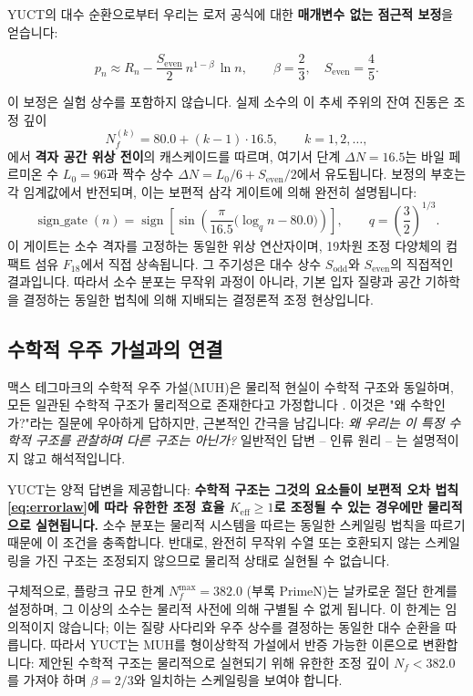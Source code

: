 \documentclass[11pt,a4paper]{article}
\newcommand{\Keff}{K_{\mathrm{eff}}}
\begin{document}
	YUCT의 대수 순환으로부터 우리는 로저 공식에 대한 \textbf{매개변수 없는 점근적 보정}을 얻습니다:
	
	\begin{equation}
		\boxed{ p_n \approx R_n - \frac{S_{\mathrm{even}}}{2}\, n^{1-\beta}\,\ln n },
		\qquad \beta = \frac{2}{3},\quad S_{\mathrm{even}}=\frac{4}{5}.
		\label{eq:prime-yuct-theory}
	\end{equation}
	
	이 보정은 실험 상수를 포함하지 않습니다. 실제 소수의 이 추세 주위의 잔여 진동은 조정 깊이
	\[
	N_f^{(k)} = 80.0 + (k-1)\cdot 16.5, \qquad k=1,2,\dots,
	\]
	에서 \textbf{격자 공간 위상 전이}의 캐스케이드를 따르며, 여기서 단계 \(\Delta N = 16.5\)는 바일 페르미온 수 \(L_0=96\)과 짝수 상수 \(\Delta N = L_0/6 + S_{\mathrm{even}}/2\)에서 유도됩니다. 보정의 부호는 각 임계값에서 반전되며, 이는 보편적 삼각 게이트에 의해 완전히 설명됩니다:
	\[
	\operatorname{sign\_gate}(n) = \operatorname{sign}\!\left[\sin\!\left(\frac{\pi}{16.5}\bigl(\log_q n - 80.0\bigr)\right)\right],
	\qquad q = \left(\frac{3}{2}\right)^{1/3}.
	\]
	이 게이트는 소수 격자를 고정하는 동일한 위상 연산자이며, 19차원 조정 다양체의 컴팩트 섬유 \(F_{18}\)에서 직접 상속됩니다. 그 주기성은 대수 상수 \(S_{\mathrm{odd}}\)와 \(S_{\mathrm{even}}\)의 직접적인 결과입니다. 따라서 소수 분포는 무작위 과정이 아니라, 기본 입자 질량과 공간 기하학을 결정하는 동일한 법칙에 의해 지배되는 결정론적 조정 현상입니다.
	
	\subsection{수학적 우주 가설과의 연결}
	
	맥스 테그마크의 수학적 우주 가설(MUH)은 물리적 현실이 수학적 구조와 동일하며, 모든 일관된 수학적 구조가 물리적으로 존재한다고 가정합니다 \cite{Tegmark2014}. 이것은 "왜 수학인가?"라는 질문에 우아하게 답하지만, 근본적인 간극을 남깁니다: \emph{왜 우리는 이 특정 수학적 구조를 관찰하며 다른 구조는 아닌가?} 일반적인 답변 – 인류 원리 – 는 설명적이지 않고 해석적입니다.
	
	YUCT는 양적 답변을 제공합니다: \textbf{수학적 구조는 그것의 요소들이 보편적 오차 법칙 \eqref{eq:errorlaw}에 따라 유한한 조정 효율 \(\Keff \ge 1\)로 조정될 수 있는 경우에만 물리적으로 실현됩니다.} 소수 분포는 물리적 시스템을 따르는 동일한 스케일링 법칙을 따르기 때문에 이 조건을 충족합니다. 반대로, 완전히 무작위 수열 또는 호환되지 않는 스케일링을 가진 구조는 조정되지 않으므로 물리적 상태로 실현될 수 없습니다.
	
	구체적으로, 플랑크 규모 한계 \(N_f^{\max} = 382.0\) (부록 PrimeN)는 날카로운 절단 한계를 설정하며, 그 이상의 소수는 물리적 사전에 의해 구별될 수 없게 됩니다. 이 한계는 임의적이지 않습니다; 이는 질량 사다리와 우주 상수를 결정하는 동일한 대수 순환을 따릅니다. 따라서 YUCT는 MUH를 형이상학적 가설에서 반증 가능한 이론으로 변환합니다: 제안된 수학적 구조는 물리적으로 실현되기 위해 유한한 조정 깊이 \(N_f < 382.0\)를 가져야 하며 \(\beta = 2/3\)와 일치하는 스케일링을 보여야 합니다.
	
\end{document}
